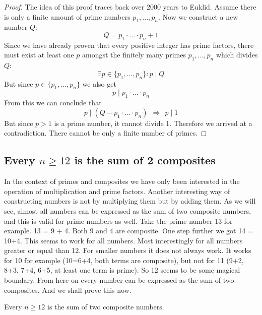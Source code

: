 \documentclass{article}
\theoremstyle{definition}
\begin{document}
\begin{proof}
   The idea of this proof traces back over 2000 years to Euklid. Assume there is only a finite amount of prime numbers $p_1,...,p_n$. Now we construct a new number $Q$:
   \begin{equation}
       Q = p_1\cdot ... \cdot p_n + 1
   \end{equation}
   Since we have already proven that every positive integer has prime factors, there must exist at least one $p$ amongst the finitely many primes $p_1,...,p_n$ which divides $Q$:
   \begin{equation}
       \exists p \in \{ p_1,...,p_n\}: p\mid Q
   \end{equation}
   But since $p \in \{ p_1,...,p_n\}$ we also get 
   \begin{equation}
       p \mid p_1\cdot ... \cdot p_n
   \end{equation}
   From this we can conclude that
   \begin{equation}
       p \mid (Q-p_1\cdot ... \cdot p_n) \: \: \Rightarrow \: \: p \mid 1
   \end{equation}
   But since $p>1$ is a prime number, it cannot divide 1. Therefore we arrived at a contradiction. There cannot be only a finite number of primes.
\end{proof}

\subsection{Every $n\geq 12$ is the sum of 2 composites}
In the context of primes and composites we have only been interested in the operation of multiplication and prime factors. Another interesting way of constructing numbers is not by multiplying them but by adding them. As we will see, almost all numbers can be expressed as the sum of two composite numbers, and this is valid for prime numbers as well. Take the prime number 13 for example. 13 = 9 + 4. Both 9 and 4 are composite. One step further we got 14 = 10+4. This seems to work for all numbers. Most interestingly for all numbers greater or equal than 12. For smaller numbers it does not always work. It works for 10 for example (10=6+4, both terms are composite), but not for 11 (9+2, 8+3, 7+4, 6+5, at least one term is prime). So 12 seems to be some magical boundary. From here on every number can be expressed as the sum of two composites. And we shall prove this now. 
\begin{theorem}
    Every $n\geq 12$ is the sum of two composite numbers.
\end{theorem}
\end{document}
